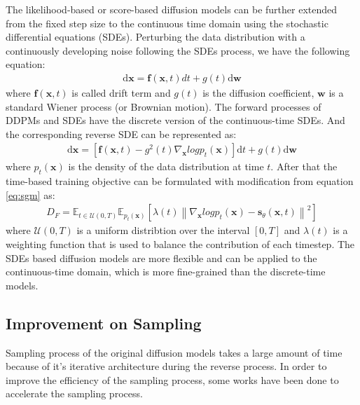 \documentclass[12pt,DIV14,BCOR12mm,a4paper,footinclude=false,headinclude,parskip=half-,twoside,openright,cleardoublepage=empty,toc=index,bibliography=totoc,listof=totoc]{scrreprt}
\numberwithin{equation}{chapter}
\begin{document}
The likelihood-based or score-based diffusion models can be further extended from the fixed step size to the continuous time domain using the stochastic differential equations (SDEs). Perturbing the data distribution with a continuously developing noise following the SDEs process, we have the following equation:
\begin{align}
  \text{d}\mathbf{x}=\mathbf{f}(\mathbf{x},t)dt + g(t)\text{d}\mathbf{w}
\end{align}
where $\mathbf{f}(\mathbf{x},t)$ is called drift term and $g(t)$ is the diffusion coefficient, $\mathbf{w}$ is a standard Wiener process (or Brownian motion). The forward processes of DDPMs and SDEs have the discrete version of the continuous-time SDEs. And the corresponding reverse SDE can be represented as:
\begin{align}
  \text{d}\mathbf{x}=\left[\mathbf{f}(\mathbf{x},t)-g^{2}(t)\nabla_{\mathbf{x}}log p_{t}(\mathbf{x})\right]\text{d}t + g(t)\text{d}\mathbf{w}
\end{align}
where $p_{t}(\mathbf{x})$ is the density of the data distribution at time $t$. After that the time-based training objective can be formulated with modification from equation \ref{eq:sgm} as:
\begin{align}
  D_{F} = \mathbb{E}_{t\in \mathcal{U}(0,T)} \mathbb{E}_{p_{t}(\mathbf{x})}\left[\lambda(t)\left\lVert\nabla_{\mathbf{x}}log p_{t}(\mathbf{x}) - \mathbf{s}_{\theta}(\mathbf{x},t)\right\rVert^{2}\right]
\end{align}
where $\mathcal{U}(0,T)$ is a uniform distribtion over the interval $[0,T]$ and $\lambda(t)$ is a weighting function that is used to balance the contribution of each timestep. The SDEs based diffusion models are more flexible and can be applied to the continuous-time domain, which is more fine-grained than the discrete-time models.
\subsection{Improvement on Sampling}

Sampling process of the original diffusion models takes a large amount of time because of it's iterative architecture during the reverse process. In order to improve the efficiency of the sampling process, some works have been done to accelerate the sampling process.
\end{document}
